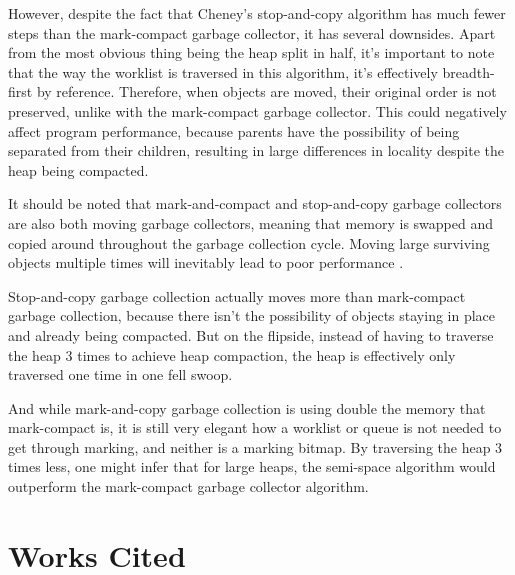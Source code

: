 \documentclass[index]{subfiles}
\begin{document}
However, despite the fact that Cheney's stop-and-copy algorithm has much fewer steps than the mark-compact garbage collector, it has several downsides. Apart from the most obvious thing being the heap split in half, it's important to note that the way the worklist is traversed in this algorithm, it's effectively breadth-first by reference. Therefore, when objects are moved, their original order is not preserved, unlike with the mark-compact garbage collector. This could negatively affect program performance, because parents have the possibility of being separated from their children, resulting in large differences in locality despite the heap being compacted.

It should be noted that mark-and-compact and stop-and-copy garbage collectors are also both moving garbage collectors, meaning that memory is swapped and copied around throughout the garbage collection cycle. Moving large surviving objects multiple times will inevitably lead to poor performance \cite[Chapter~4]{gc_handbook}.

Stop-and-copy garbage collection actually moves more than mark-compact garbage collection, because there isn't the possibility of objects staying in place and already being compacted. But on the flipside, instead of having to traverse the heap 3 times to achieve heap compaction, the heap is effectively only traversed one time in one fell swoop.

And while mark-and-copy garbage collection is using double the memory that mark-compact is, it is still very elegant how a worklist or queue is not needed to  get through marking, and neither is a marking bitmap. By traversing the heap 3 times less, one might infer that for large heaps, the semi-space algorithm would outperform the mark-compact garbage collector algorithm.


\section{Works Cited}

\printbibliography
\end{document}

